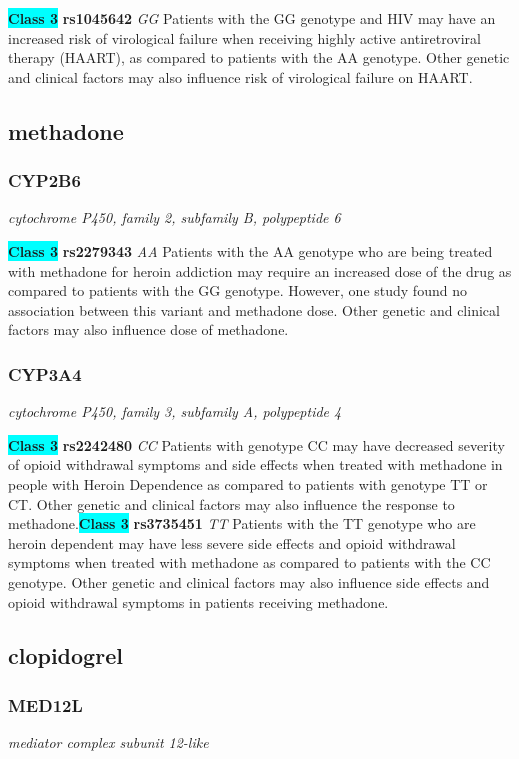 \documentclass{report}
\begin{document}
\textbf{\colorbox{cyan} {Class 3}} \textbf{ rs1045642 } \textit{ GG }
Patients with the GG genotype and HIV may have an increased risk of virological failure when receiving highly active antiretroviral therapy (HAART), as compared to patients with the AA genotype. Other genetic and clinical factors may also influence risk of virological failure on HAART.\newline\subsection{ methadone }\subsubsection{ CYP2B6 }
\textit{ cytochrome P450, family 2, subfamily B, polypeptide 6 }

\textbf{\colorbox{cyan} {Class 3}} \textbf{ rs2279343 } \textit{ AA }
Patients with the AA genotype who are being treated with methadone for heroin addiction may require an increased dose of the drug as compared to patients with the GG genotype. However, one study found no association between this variant and methadone dose. Other genetic and clinical factors may also influence dose of methadone.\newline\subsubsection{ CYP3A4 }
\textit{ cytochrome P450, family 3, subfamily A, polypeptide 4 }

\textbf{\colorbox{cyan} {Class 3}} \textbf{ rs2242480 } \textit{ CC }
Patients with genotype CC may have decreased severity of opioid withdrawal symptoms and side effects when treated with methadone in people with Heroin Dependence as compared to patients with genotype TT or CT. Other genetic and clinical factors may also influence the response to methadone.\newline\textbf{\colorbox{cyan} {Class 3}} \textbf{ rs3735451 } \textit{ TT }
Patients with the TT genotype who are heroin dependent may have less severe side effects and opioid withdrawal symptoms when treated with methadone as compared to patients with the CC genotype. Other genetic and clinical factors may also influence side effects and opioid withdrawal symptoms in patients receiving methadone.\newline\subsection{ clopidogrel }\subsubsection{ MED12L }
\textit{ mediator complex subunit 12-like }
\end{document}
